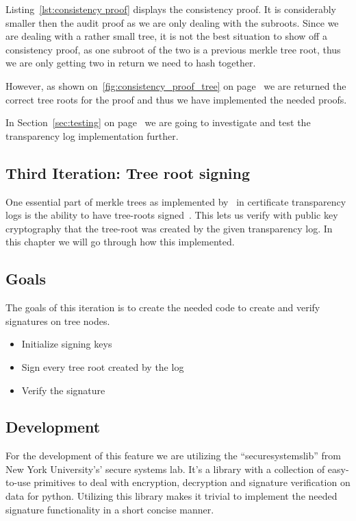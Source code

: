 \documentclass[../Main/thesis.tex]{subfiles}
\begin{document}
Listing~\ref{lst:consistency proof} displays the consistency proof. It is
considerably smaller then the audit proof as we are only dealing with the
subroots. Since we are dealing with a rather small tree, it is not the best
situation to show off a consistency proof, as one subroot of the two is a
previous merkle tree root, thus we are only getting two in return we need to
hash together. 

However, as shown on~\ref{fig:consistency_proof_tree} on
page~\pageref{fig:consistency_proof_tree} we are returned the correct tree roots
for the proof and thus we have implemented the needed proofs.

In Section~\ref{sec:testing} on page~\pageref{sec:testing} we are going to
investigate and test the transparency log implementation further.

\subsection{Third Iteration: Tree root signing}%
\label{sub:tree_root_signing}
One essential part of merkle trees as implemented
by~\citeauthor{b.-laurie-a.-langley-e.kaster-google-2013} in certificate
transparency logs is the ability to have tree-roots
signed~\cite{b.-laurie-a.-langley-e.kaster-google-2013}. This lets us verify
with public key cryptography that the tree-root was created by the given
transparency log. In this chapter we will go through how this implemented.

\subsection*{Goals}%
\label{sub:third_iteration_goals}

The goals of this iteration is to create the needed code to create and verify
signatures on tree nodes.

\begin{itemize}
    \item Initialize signing keys
    \item Sign every tree root created by the log
    \item Verify the signature
\end{itemize}

\subsection*{Development}%
\label{sub:third_iteration_development}
For the development of this feature we are utilizing the ``securesystemslib'' from
New York University's' secure systems lab. It's a library with a collection of
easy-to-use primitives to deal with encryption, decryption and signature
verification on data for python. Utilizing this library makes it trivial to
implement the needed signature functionality in a short concise manner.
\end{document}
